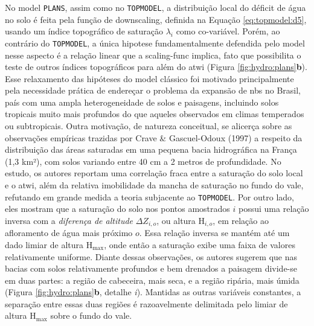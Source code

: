 \documentclass[./main.tex]{subfiles}
\begin{document}
\par No \gls{model} \texttt{PLANS}, assim como no \texttt{TOPMODEL}, a distribuição local do déficit de água no solo é feita pela função de \gls{downscaling}, definida na Equação \ref{eq:topmodel:d5}, usando um índice topográfico de saturação $\lambda_{i}$ como co-variável. Porém, ao contrário do \texttt{TOPMODEL}, a única \gls{hipotese} fundamentalmente defendida pelo \gls{model} nesse aspecto é a relação linear que a \gls{scaling-func} implica, fato que possibilita o teste de outros índices topográficos para além do \acrshort{atwi} (Figura \ref{fig:hydro:plans}\textbf{b}). Esse relaxamento das hipóteses do \gls{model} clássico foi motivado principalmente pela necessidade prática de endereçar o problema da expansão de \acrshort{nbs} no Brasil, país com uma ampla heterogeneidade de solos e paisagens, incluindo solos tropicais muito mais profundos do que aqueles observados em climas temperados ou subtropicais. Outra motivação, de natureza conceitual, se alicerça sobre as observações empíricas trazidas por Crave \& Gascuel-Odoux (1997) \cite{Crave1997a} a respeito da distribuição das áreas saturadas em uma pequena bacia hidrográfica na França (1,3 km²), com solos variando entre 40 cm a 2 metros de profundidade. No estudo, os autores reportam uma correlação fraca entre a saturação do solo local e o \acrshort{atwi}, além da relativa imobilidade da mancha de saturação no fundo do vale, refutando em grande medida a \gls{teoria} subjacente ao \texttt{TOPMODEL}. Por outro lado, eles mostram que a saturação do solo nos pontos amostrados $i$ possui uma relação inversa com a \textit{diferença de altitude} $\Delta Z_{i, o}$, ou altura $\text{H}_{i, o}$, em relação ao afloramento de água mais próximo $o$. Essa relação inversa se mantém até um dado limiar de altura $\text{H}_\text{max}$, onde então a saturação exibe uma faixa de valores relativamente uniforme. Diante dessas observações, os autores sugerem que nas bacias com solos relativamente profundos e bem drenados a paisagem divide-se em duas partes: a região de cabeceira, mais seca, e a região ripária, mais úmida (Figura \ref{fig:hydro:plans}\textbf{b}, detalhe \textit{i}). Mantidas as outras variáveis constantes, a separação entre essas duas regiões é razoavelmente delimitada pelo limiar de altura $\text{H}_\text{max}$ sobre o fundo do vale. 

\end{document}
